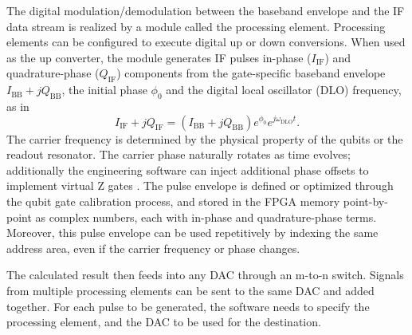 \documentclass{ieeetran}
\begin{document}

The digital modulation/demodulation between the baseband envelope and the IF data stream is realized by a module called the processing element.
Processing elements can be configured to execute digital up or down conversions.
When used as the up converter, the module generates IF pulses in-phase ($I_{\mathrm{IF}}$) and quadrature-phase ($Q_{\mathrm{IF}}$) components from the gate-specific baseband envelope $I_{\mathrm{BB}}+jQ_{\mathrm{BB}}$, the initial phase $\phi_0$ and the digital local oscillator (DLO) frequency, as in
\begin{equation}
\label{eq1}
I_{\mathrm{IF}} + jQ_{\mathrm{IF}} = (I_{\mathrm{BB}} + jQ_{\mathrm{BB}}) e^{\phi_0} e^{j\omega_{\mathrm{DLO}}t} .
\end{equation}
The carrier frequency is determined by the physical property of the qubits or the readout resonator.
The carrier phase naturally rotates as time evolves; additionally the engineering software can inject additional phase offsets to implement virtual Z gates \cite{mckay2017efficient}.
The pulse envelope is defined or optimized through the qubit gate calibration process, and stored in the FPGA memory point-by-point as complex numbers, each with in-phase and quadrature-phase terms. 
Moreover, this pulse envelope can be used repetitively by indexing the same address area, even if the carrier frequency or phase changes.

The calculated result then feeds into any DAC through an m-to-n switch.
Signals from multiple processing elements can be sent to the same DAC and added together.
For each pulse to be generated, the software needs to specify the processing element, and the DAC to be used for the destination.
\end{document}
